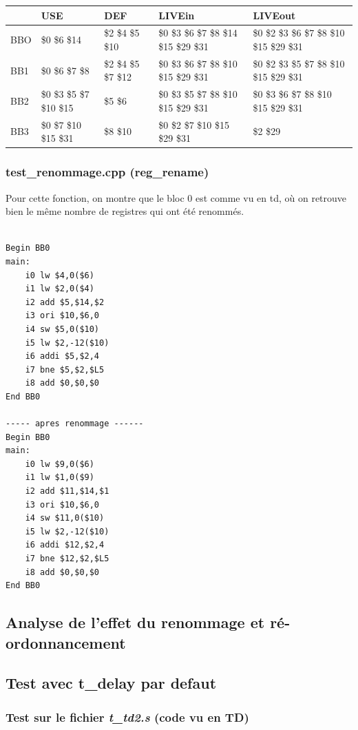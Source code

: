 \documentclass[11pt, openany]{article}
\begin{document}
\begin{tabular}{ |p{2cm}||p{3cm}|p{3cm}|p{3cm}|p{3cm}|  }
 \hline
   & USE & DEF & LIVEin & LIVEout\\
 \hline
 BBO & \$0 \$6 \$14 & \$2 \$4 \$5 \$10 & \$0 \$3 \$6 \$7 \$8 \$14 \$15 \$29 \$31 & \$0 \$2 \$3 \$6 \$7 \$8 \$10 \$15 \$29 \$31 \\
 \hline
 BB1 & \$0 \$6 \$7 \$8 & \$2 \$4 \$5 \$7 \$12 & \$0 \$3 \$6 \$7 \$8 \$10 \$15 \$29 \$31 & \$0 \$2 \$3 \$5 \$7 \$8 \$10 \$15 \$29 \$31  \\
 \hline
 BB2 & \$0 \$3 \$5 \$7 \$10 \$15 &  \$5 \$6 & \$0 \$3 \$5 \$7 \$8 \$10 \$15 \$29 \$31 & \$0 \$3 \$6 \$7 \$8 \$10 \$15 \$29 \$31 \\
 \hline
 BB3 & \$0 \$7 \$10 \$15 \$31 & \$8 \$10 & \$0 \$2 \$7 \$10 \$15 \$29 \$31 & \$2 \$29  \\
 \hline
\end{tabular}

\subsubsection{test\_renommage.cpp (reg\_rename)}
Pour cette fonction, on montre que le bloc 0 est comme vu en td, où on retrouve bien le même nombre de registres qui ont été renommés.
\begin{lstlisting}

Begin BB0
main:
    i0 lw $4,0($6)
    i1 lw $2,0($4)
    i2 add $5,$14,$2
    i3 ori $10,$6,0
    i4 sw $5,0($10)
    i5 lw $2,-12($10)
    i6 addi $5,$2,4
    i7 bne $5,$2,$L5
    i8 add $0,$0,$0
End BB0

----- apres renommage ------
Begin BB0
main:
    i0 lw $9,0($6)
    i1 lw $1,0($9)
    i2 add $11,$14,$1
    i3 ori $10,$6,0
    i4 sw $11,0($10)
    i5 lw $2,-12($10)
    i6 addi $12,$2,4
    i7 bne $12,$2,$L5
    i8 add $0,$0,$0
End BB0

\end{lstlisting}

\newpage

\subsection{Analyse de l’effet du renommage et ré-ordonnancement}
\subsection{Test avec t\_delay par defaut}
\subsubsection{Test sur le fichier \textit{t\_td2.s} (code vu en TD)}
\end{document}
